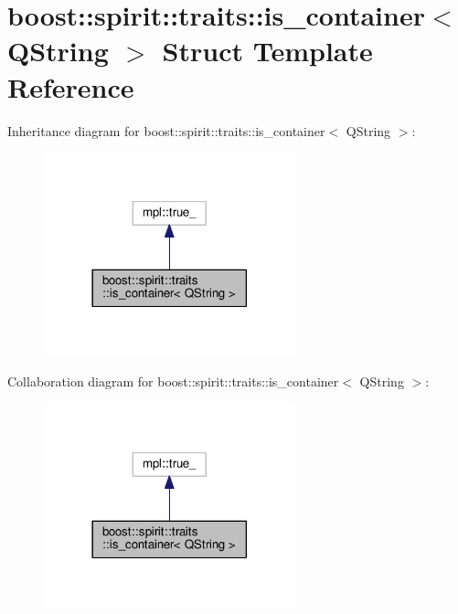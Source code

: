 \hypertarget{structboost_1_1spirit_1_1traits_1_1is__container_3_01_q_string_01_4}{}\section{boost\+:\+:spirit\+:\+:traits\+:\+:is\+\_\+container$<$ Q\+String $>$ Struct Template Reference}
\label{structboost_1_1spirit_1_1traits_1_1is__container_3_01_q_string_01_4}


Inheritance diagram for boost\+:\+:spirit\+:\+:traits\+:\+:is\+\_\+container$<$ Q\+String $>$\+:
\nopagebreak
\begin{figure}[H]
\begin{center}
\leavevmode
\includegraphics[width=206pt]{structboost_1_1spirit_1_1traits_1_1is__container_3_01_q_string_01_4__inherit__graph}
\end{center}
\end{figure}


Collaboration diagram for boost\+:\+:spirit\+:\+:traits\+:\+:is\+\_\+container$<$ Q\+String $>$\+:
\nopagebreak
\begin{figure}[H]
\begin{center}
\leavevmode
\includegraphics[width=206pt]{structboost_1_1spirit_1_1traits_1_1is__container_3_01_q_string_01_4__coll__graph}
\end{center}
\end{figure}


